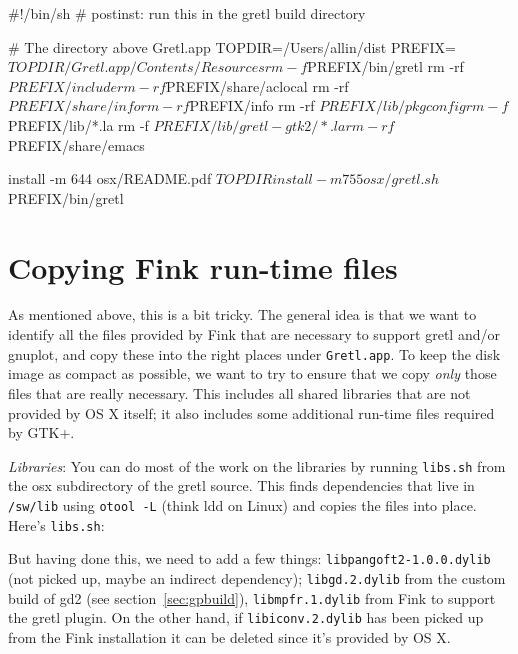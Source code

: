 \documentclass{article}
\begin{document}
\begin{code}
#!/bin/sh
# postinst: run this in the gretl build directory

# The directory above Gretl.app
TOPDIR=/Users/allin/dist
PREFIX=$TOPDIR/Gretl.app/Contents/Resources

rm -f $PREFIX/bin/gretl
rm -rf $PREFIX/include
rm -rf $PREFIX/share/aclocal
rm -rf $PREFIX/share/info
rm -rf $PREFIX/info
rm -rf $PREFIX/lib/pkgconfig
rm -f $PREFIX/lib/*.la
rm -f $PREFIX/lib/gretl-gtk2/*.la
rm -rf $PREFIX/share/emacs

install -m 644 osx/README.pdf $TOPDIR
install -m 755 osx/gretl.sh $PREFIX/bin/gretl
\end{code}

\section{Copying Fink run-time files}

As mentioned above, this is a bit tricky.  The general idea is that we
want to identify all the files provided by Fink that are necessary to
support gretl and/or gnuplot, and copy these into the right places
under \texttt{Gretl.app}.  To keep the disk image as compact as
possible, we want to try to ensure that we copy \textit{only} those
files that are really necessary.  This includes all shared libraries
that are not provided by OS X itself; it also includes some additional
run-time files required by GTK+.

\textit{Libraries}: You can do most of the work on the libraries by
running \texttt{libs.sh} from the osx subdirectory of the gretl
source.  This finds dependencies that live in \texttt{/sw/lib} using
\texttt{otool -L} (think ldd on Linux) and copies the files
into place. Here's \texttt{libs.sh}:


But having done this, we need to add a few things:
\texttt{libpangoft2-1.0.0.dylib} (not picked up, maybe an indirect
dependency); \texttt{libgd.2.dylib} from the custom build of gd2 (see
section~\ref{sec:gpbuild}), \texttt{libmpfr.1.dylib} from Fink to
support the gretl plugin.  On the other hand, if
\texttt{libiconv.2.dylib} has been picked up from the Fink
installation it can be deleted since it's provided by OS X.
\end{document}
